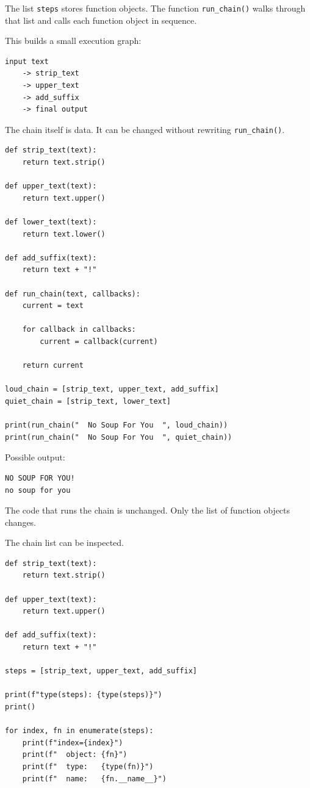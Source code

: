 The list \texttt{steps} stores function objects. The function \texttt{run\_chain()} walks through that list and calls each function object in sequence.

This builds a small execution graph:

\begin{verbatim}
input text
    -> strip_text
    -> upper_text
    -> add_suffix
    -> final output
\end{verbatim}

The chain itself is data. It can be changed without rewriting \texttt{run\_chain()}.

\begin{verbatim}
def strip_text(text):
    return text.strip()

def upper_text(text):
    return text.upper()

def lower_text(text):
    return text.lower()

def add_suffix(text):
    return text + "!"

def run_chain(text, callbacks):
    current = text

    for callback in callbacks:
        current = callback(current)

    return current

loud_chain = [strip_text, upper_text, add_suffix]
quiet_chain = [strip_text, lower_text]

print(run_chain("  No Soup For You  ", loud_chain))
print(run_chain("  No Soup For You  ", quiet_chain))
\end{verbatim}

Possible output:

\begin{verbatim}
NO SOUP FOR YOU!
no soup for you
\end{verbatim}

The code that runs the chain is unchanged. Only the list of function objects changes.

The chain list can be inspected.

\begin{verbatim}
def strip_text(text):
    return text.strip()

def upper_text(text):
    return text.upper()

def add_suffix(text):
    return text + "!"

steps = [strip_text, upper_text, add_suffix]

print(f"type(steps): {type(steps)}")
print()

for index, fn in enumerate(steps):
    print(f"index={index}")
    print(f"  object: {fn}")
    print(f"  type:   {type(fn)}")
    print(f"  name:   {fn.__name__}")
\end{verbatim}


